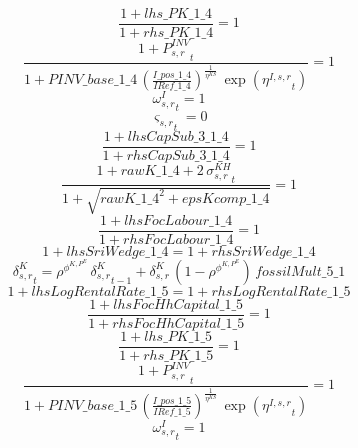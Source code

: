 \begin{dmath}
\frac{1+{lhs\_PK\_1\_4}}{1+{rhs\_PK\_1\_4}}=1
\end{dmath}
\begin{dmath}
\frac{1+{{P^{INV}_{s,r}}}_{t}}{1+{PINV\_base\_1\_4}\, \left(\frac{{I\_pos\_1\_4}}{{IRef\_1\_4}}\right)^{\frac{1}{{{\eta^{KS}}}}}\, \exp\left({{\eta^{I,s,r}}}_{t}\right)}=1
\end{dmath}
\begin{dmath}
{{\omega^I_{s,r}}}_{t}=1
\end{dmath}
\begin{dmath}
{{\varsigma_{s,r}}}_{t}=0
\end{dmath}
\begin{dmath}
\frac{1+{lhsCapSub\_3\_1\_4}}{1+{rhsCapSub\_3\_1\_4}}=1
\end{dmath}
\begin{dmath}
\frac{1+{rawK\_1\_4}+2\, {{\sigma^{KH}_{s,r}}}_{t}}{1+\sqrt{{rawK\_1\_4}^{2}+{epsKcomp\_1\_4}}}=1
\end{dmath}
\begin{dmath}
\frac{1+{lhsFocLabour\_1\_4}}{1+{rhsFocLabour\_1\_4}}=1
\end{dmath}
\begin{dmath}
1+{lhsSriWedge\_1\_4}=1+{rhsSriWedge\_1\_4}
\end{dmath}
\begin{dmath}
{{\delta^{K}_{s,r}}}_{t}={{\rho^{\phi^{K,P^E}}}}\, {{\delta^{K}_{s,r}}}_{t-1}+{{\delta^{K}_{s,r}}}\, \left(1-{{\rho^{\phi^{K,P^E}}}}\right)\, {fossilMult\_5\_1}
\end{dmath}
\begin{dmath}
1+{lhsLogRentalRate\_1\_5}=1+{rhsLogRentalRate\_1\_5}
\end{dmath}
\begin{dmath}
\frac{1+{lhsFocHhCapital\_1\_5}}{1+{rhsFocHhCapital\_1\_5}}=1
\end{dmath}
\begin{dmath}
\frac{1+{lhs\_PK\_1\_5}}{1+{rhs\_PK\_1\_5}}=1
\end{dmath}
\begin{dmath}
\frac{1+{{P^{INV}_{s,r}}}_{t}}{1+{PINV\_base\_1\_5}\, \left(\frac{{I\_pos\_1\_5}}{{IRef\_1\_5}}\right)^{\frac{1}{{{\eta^{KS}}}}}\, \exp\left({{\eta^{I,s,r}}}_{t}\right)}=1
\end{dmath}
\begin{dmath}
{{\omega^I_{s,r}}}_{t}=1
\end{dmath}
